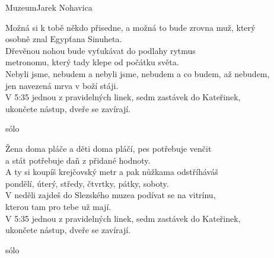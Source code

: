 \begin{song}{Muzeum}{Jarek Nohavica}
\begin{guitar}
Možná si k tobě někdo přisedne, a možná to bude zrovna muž, který \\
osobně znal Egypťana Sinuheta.\\
Dřevěnou nohou bude vyťukávat do podlahy rytmus \\
metronomu, který tady klepe od počátku světa.\\
Nebyli jsme, nebudem a nebyli jsme, nebudem a co budem, až nebudem,\\
jen navezená mrva v boží stáji.\\
V 5:35 jednou z pravidelných linek, sedm zastávek do Kateřinek,\\
ukončete nástup, dveře se zavírají.\\
\end{guitar}

\begin{guitar}
sólo\\
\end{guitar}

\begin{guitar}
Žena doma pláče a děti doma pláčí, pes potřebuje venčit\\
a stát potřebuje daň z přidané hodnoty.\\
A ty si koupíš krejčovský metr a pak nůžkama odstříháváš\\
pondělí, úterý, středy, čtvrtky, pátky, soboty.\\
V neděli zajdeš do Slezského muzea podívat se na vitrínu,\\
kterou tam pro tebe už mají.\\
V 5:35 jednou z pravidelných linek, sedm zastávek do Kateřinek,\\
ukončete nástup, dveře se zavírají. \\
\end{guitar}

\begin{guitar}
sólo\\
\end{guitar}
\end{song}
